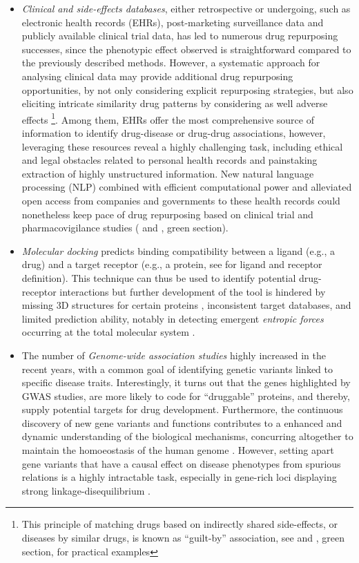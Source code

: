 \begin{itemize}
\item \emph{Clinical and side-effects databases}, either retrospective or undergoing, such as electronic health records (EHRs), post-marketing surveillance data and publicly available clinical trial data, has led to numerous drug repurposing successes, since the phenotypic effect observed is straightforward compared to the previously described methods. However, a systematic approach for analysing clinical data may provide additional drug repurposing opportunities, by not only considering explicit repurposing strategies, but also eliciting intricate similarity drug patterns by considering as well adverse effects \footnote{This principle of matching drugs based on indirectly shared side-effects, or diseases by similar drugs, is known as \enquote{guilt-by} association, see \autocite{paik_etal15} and , green section, for practical examples}. Among them, EHRs offer the most comprehensive source of information to identify drug-disease or drug-drug associations, however, leveraging these resources reveal a highly challenging task, including ethical and legal obstacles related to personal health records and painstaking extraction of highly unstructured information.
New natural language processing (NLP) combined with efficient computational power and alleviated open access from companies and governments to these health records could nonetheless keep pace of drug repurposing based on clinical trial and pharmacovigilance studies (\autocite{paik_etal15} and , green section).

\item \emph{Molecular docking} predicts binding compatibility between a ligand (e.g., a drug) and a target receptor (e.g., a protein, see  for ligand and receptor definition). This technique can thus be used to identify potential drug-receptor interactions but further development of the tool is hindered by missing 3D structures for certain proteins \autocite{huang_etal18}, inconsistent target databases, and limited prediction ability, notably in detecting emergent \emph{entropic forces} occurring at the total molecular system \autocite{pagadala_etal17}.

\item The number of \emph{Genome-wide association studies} highly increased in the recent years, with a common goal of identifying genetic variants linked to specific disease traits. Interestingly, it turns out that the genes highlighted by GWAS studies, are more likely to code for \enquote{druggable} proteins, and thereby, supply potential targets for drug development. Furthermore, the continuous discovery of new gene variants and functions contributes to a enhanced and dynamic understanding of the biological mechanisms, concurring altogether to maintain the homoeostasis of the human genome \autocite{sanseau_etal12}.
However, setting apart gene variants that have a causal effect on disease phenotypes from spurious relations is a highly intractable task, especially in gene-rich loci displaying strong \gls{linkage-disequilibrium} \autocite{wang_zhang13}. 


\end{itemize}
